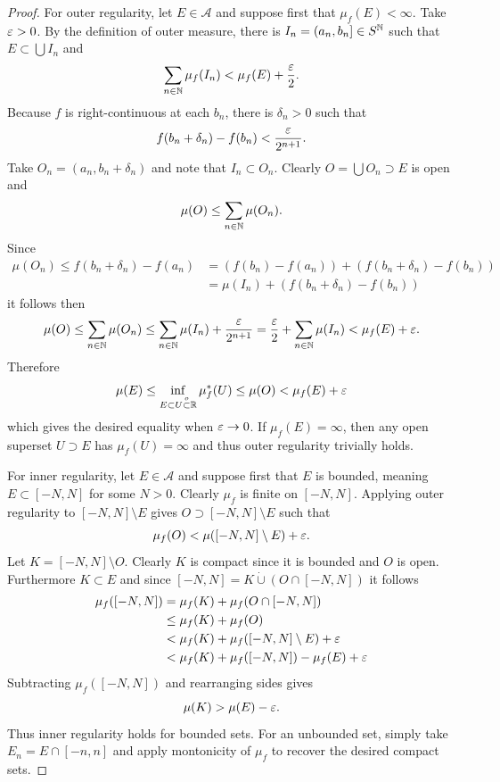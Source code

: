 \documentclass[hw_all.tex]{subfiles}
\begin{document}
\begin{proof}
    For outer regularity, let $E \in \mathcal{A}$ and suppose first that $\mu_f(E) < \infty$. Take $\varepsilon > 0$. By the definition of outer measure, there is $I_n = (a_n,b_n] \in S^{\mathbb{N}}$ such that $E \subset \bigcup I_n$ and
    \[
        \sum_{n \in \mathbb{N}} \mu_f(I_n) < \mu_f(E) + \frac{\varepsilon}{2}
    .\]
    Because $f$ is right-continuous at each $b_n$, there is $\delta_n > 0$ such that
    \[
        f(b_n + \delta_n) - f(b_n) < \frac{\varepsilon}{2^{n+1}}
    .\]
    Take $O_n = (a_n, b_n + \delta_n)$ and note that $I_n \subset O_n$. Clearly $O = \bigcup O_n \supset E$ is open and
    \[
        \mu(O) \leq \sum_{n \in \mathbb{N}} \mu(O_n)
    .\]
    Since
    \begin{align*}
        \mu(O_n) \leq f(b_n + \delta_n) - f(a_n) &= (f(b_n) - f(a_n)) + (f(b_n + \delta_n) - f(b_n)) \\
&= \mu(I_n) + (f(b_n + \delta_n) - f(b_n))
    \end{align*}
    it follows then
    \[
        \mu(O) \leq \sum_{n \in \mathbb{N}} \mu(O_n) \leq \sum_{n \in \mathbb{N}} \mu(I_n) + \frac{\varepsilon}{2^{n+1}} = \frac{\varepsilon}{2} + \sum_{n \in \mathbb{N}} \mu(I_n) < \mu_f(E) + \varepsilon
    .\]
    Therefore
    \[
        \mu(E) \leq \inf_{E \subset U \overset{o}{\subset} \mathbb{R}} \mu_f^*(U) \leq \mu(O) < \mu_f(E) + \varepsilon
    \]
    which gives the desired equality when $\varepsilon \to 0$. If $\mu_f(E) = \infty$, then any open superset $U \supset E$ has $\mu_f(U) = \infty$ and thus outer regularity trivially holds.

    For inner regularity, let $E \in \mathcal{A}$ and suppose first that $E$ is bounded, meaning $E \subset [-N, N]$ for some $N > 0$. Clearly $\mu_f$ is finite on $[-N, N]$. Applying outer regularity to $[-N, N] \setminus E$ gives $O \supset [-N, N] \setminus E$ such that
    \[
        \mu_f(O) < \mu([-N, N] \setminus E) + \varepsilon
    .\]
    Let $K = [-N, N] \setminus O$. Clearly $K$ is compact since it is bounded and $O$ is open. Furthermore $K \subset E$ and since $[-N, N] = K \dot\cup (O \cap [-N, N])$ it follows
    \begin{align*}
        \mu_f([-N, N]) &= \mu_f(K) + \mu_f(O \cap [-N, N]) \\
                       &\leq \mu_f(K) + \mu_f(O) \\
                       &< \mu_f(K) + \mu_f([-N, N] \setminus E) + \varepsilon \\
                       &< \mu_f(K) + \mu_f([-N, N]) - \mu_f(E) + \varepsilon \\
    \end{align*}
    Subtracting $\mu_f([-N, N])$ and rearranging sides gives
    \[
        \mu(K) > \mu(E) - \varepsilon
    .\]
    Thus inner regularity holds for bounded sets. For an unbounded set, simply take $E_n = E \cap [-n, n]$ and apply montonicity of $\mu_f$ to recover the desired compact sets.



\end{proof}
\end{document}
